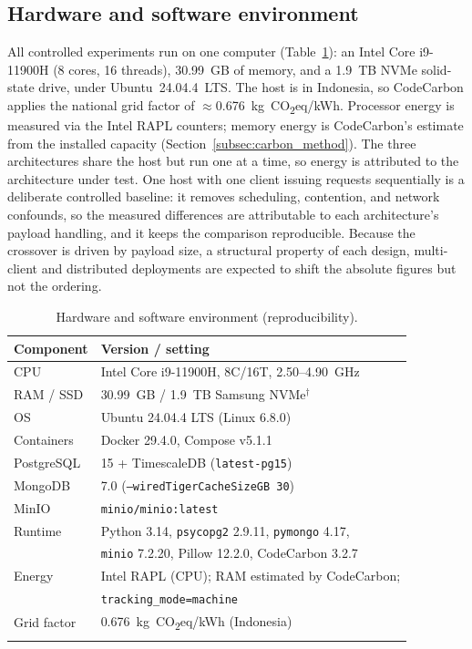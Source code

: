 \documentclass[pdflatex,sn-basic]{sn-jnl}%
\begin{document}
\subsection{Hardware and software environment}\label{subsec:env}
{\color{markup}All controlled experiments run on one computer (Table~\ref{tab:env}): an Intel Core i9-11900H (8 cores, 16 threads), 30.99~GB of memory, and a 1.9~TB NVMe solid-state drive, under Ubuntu~24.04.4~LTS.} {\color{markup}The host is in Indonesia, so CodeCarbon applies the national grid factor of $\approx$0.676~kg~CO\textsubscript{2}eq/kWh.} {\color{markup}Processor energy is measured via the Intel RAPL counters; memory energy is CodeCarbon's estimate from the installed capacity (Section~\ref{subsec:carbon_method}).} {\color{markup}The three architectures share the host but run one at a time, so energy is attributed to the architecture under test.} {\color{markup}One host with one client issuing requests sequentially is a deliberate controlled baseline: it removes scheduling, contention, and network confounds, so the measured differences are attributable to each architecture's payload handling, and it keeps the comparison reproducible.} {\color{markup}Because the crossover is driven by payload size, a structural property of each design, multi-client and distributed deployments are expected to shift the absolute figures but not the ordering.}

\begin{table}[htbp]
\color{markup}
\caption{Hardware and software environment (reproducibility).}\label{tab:env}
\small
\begin{tabular}{@{}ll@{}}
\toprule
Component & Version / setting \\
\midrule
CPU & Intel Core i9-11900H, 8C/16T, 2.50--4.90~GHz \\
RAM / SSD & 30.99~GB / 1.9~TB Samsung NVMe$^{\dagger}$ \\
OS & Ubuntu 24.04.4 LTS (Linux 6.8.0) \\
Containers & Docker 29.4.0, Compose v5.1.1 \\
PostgreSQL & 15 + TimescaleDB (\texttt{latest-pg15}) \\
MongoDB & 7.0 (\texttt{--wiredTigerCacheSizeGB 30}) \\
MinIO & \texttt{minio/minio:latest} \\
Runtime & Python 3.14, \texttt{psycopg2} 2.9.11, \texttt{pymongo} 4.17, \\
        & \texttt{minio} 7.2.20, Pillow 12.2.0, CodeCarbon 3.2.7 \\
Energy & Intel RAPL (CPU); RAM estimated by CodeCarbon; \\
       & \texttt{tracking\_mode=machine} \\
Grid factor & 0.676~kg~CO\textsubscript{2}eq/kWh (Indonesia) \\
\botrule
\end{tabular}
\end{table}
\end{document}
